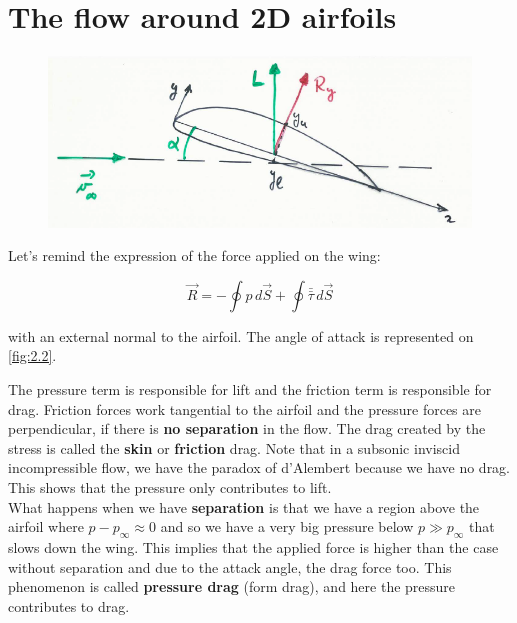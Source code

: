 		 \newpage
		 
	\section{The flow around 2D airfoils}
		
		\begin{figure}
		\vspace{-5mm}
		\includegraphics[scale=0.35]{ch2/3}
		\label{fig:2.2}
		\end{figure}
		Let's remind the expression of the force applied on the wing:
		
		\begin{equation}
		\vec{R} = -\oint p \, d\vec{S} + \oint \bar{\bar{\tau}} \, d\vec{S} 
		\end{equation}
		
		with an external normal to the airfoil. The angle of attack is represented on \autoref{fig:2.2}.

		The pressure term is responsible for lift and the friction term is responsible for drag. Friction forces work tangential to the airfoil and the pressure forces are perpendicular, if there is \textbf{no separation} in the flow. The drag created by the stress is called the \textbf{skin} or \textbf{friction} drag. 
		Note that in a subsonic inviscid incompressible flow, we have the paradox of d’Alembert because we have no drag. This shows that the pressure only contributes to lift. \\

		What happens when we have \textbf{separation} is that we have a region above the airfoil where $p-p_\infty \approx 0$ and so we have a very big pressure below $p\gg p_\infty$ that slows down the wing. This implies that the applied force is higher than the case without separation and due to the attack angle, the drag force too. This phenomenon is called \textbf{pressure drag} (form drag), and here the pressure contributes to drag.
		

